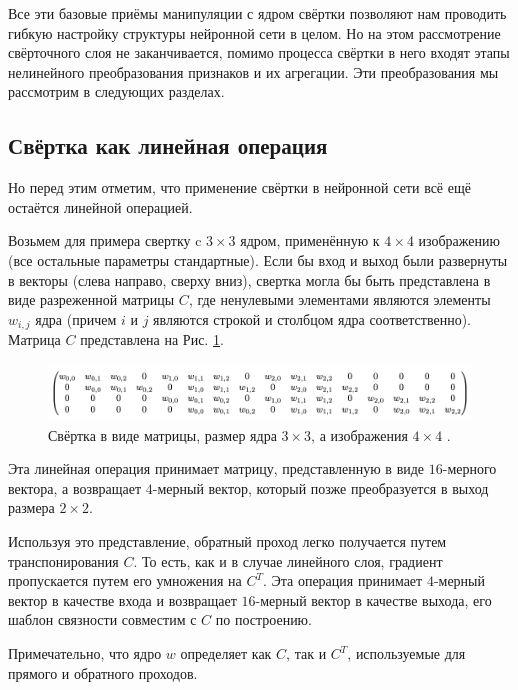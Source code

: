 \documentclass[12pt, fleqn]{article}
\begin{document}
    Все эти базовые приёмы манипуляции с ядром свёртки позволяют нам проводить гибкую настройку
    структуры нейронной сети в целом. Но на этом рассмотрение свёрточного слоя не заканчивается, помимо
    процесса свёртки в него входят этапы нелинейного преобразования признаков и их агрегации.
    Эти преобразования мы рассмотрим в следующих разделах.

    \subsection{Свёртка как линейная операция}

    Но перед этим отметим, что применение свёртки в нейронной сети всё ещё остаётся линейной операцией.

    Возьмем для примера свертку c $3 \times 3$ ядром, применённую к $4 \times 4$ изображению (все остальные параметры стандартные). 
    Если бы вход и выход были развернуты в 
    векторы (слева направо, сверху вниз), свертка могла бы быть представлена в виде разреженной матрицы $C$, где ненулевыми 
    элементами являются элементы $w_{i,j}$ ядра (причем $i$ и $j$ являются строкой и столбцом ядра соответственно). Матрица $C$ 
    представлена на Рис. \ref{linear_conv}.

    \begin{figure}[ht]
        \centering
        \includegraphics[scale=0.8]{pics/linear_conv.png}
        \caption{Свёртка в виде матрицы, размер ядра $3 \times 3$, а изображения $4 \times 4$ \cite{dumoulin2016guide}.}
        \label{linear_conv}
    \end{figure}

    Эта линейная операция принимает матрицу, представленную в виде $16$-мерного вектора, а возвращает 
    $4$-мерный вектор, который позже преобразуется в выход размера $2 \times 2$.

    Используя это представление, обратный проход легко получается путем транспонирования $C$. То есть, как и в случае линейного слоя, 
    градиент пропускается путем его умножения на $C^T$. Эта операция принимает $4$-мерный вектор в 
    качестве входа и возвращает $16$-мерный вектор в качестве выхода, его шаблон связности совместим с $C$ по построению.

    Примечательно, что ядро $w$ определяет как $C$, так и $C^T$, используемые для прямого и обратного проходов.
\end{document}
